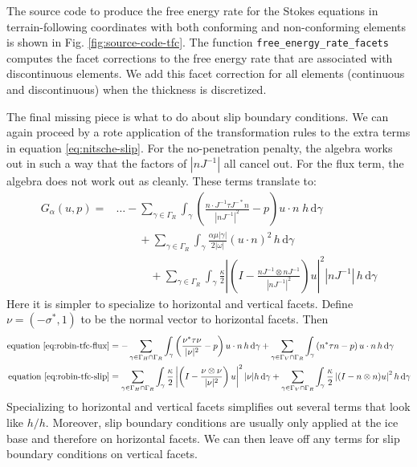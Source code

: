 \documentclass[gmd, manuscript]{copernicus}
\begin{document}
The source code to produce the free energy rate for the Stokes equations in terrain-following coordinates with both conforming and non-conforming elements is shown in Fig. \ref{fig:source-code-tfc}.
The function \texttt{free\_energy\_rate\_facets} computes the facet corrections to the free energy rate that are associated with discontinuous elements.
We add this facet correction for all elements (continuous and discontinuous) when the thickness is discretized.

The final missing piece is what to do about slip boundary conditions.
We can again proceed by a rote application of the transformation rules to the extra terms in equation \eqref{eq:nitsche-slip}.
For the no-penetration penalty, the algebra works out in such a way that the factors of $|nJ^{-1}|$ all cancel out.
For the flux term, the algebra does not work out as cleanly.
These terms translate to:
\begin{subequations}
    \begin{align}
        G_\alpha(u, p) = & \ldots - \sum_{\gamma\in\Gamma_R}\int_\gamma\left(\frac{n\cdot J^{-1}\tau J^{-*}n}{|nJ^{-1}|^2} - p\right)u\cdot n\; h\,\mathrm{d}\gamma \label{eq:robin-tfc-flux}\\
        & \qquad + \sum_{\gamma\in\Gamma_R}\int_\gamma\frac{\alpha\mu|\gamma|}{2|\omega|}(u\cdot n)^2\, h\,\mathrm{d}\gamma \\
        & \qquad\quad + \sum_{\gamma\in\Gamma_R}\int_\gamma\frac{\kappa}{2}\left|\left(I - \frac{nJ^{-1}\otimes nJ^{-1}}{|nJ^{-1}|^2}\right)u\right|^2|nJ^{-1}|\,h\,\mathrm{d}\gamma \label{eq:robin-tfc-slip}
    \end{align}
\end{subequations}
Here it is simpler to specialize to horizontal and vertical facets.
Define $\nu = (-\sigma^*, 1)$ to be the normal vector to horizontal facets.
Then
\begin{subequations}
    \begin{align}
        \text{equation \eqref{eq:robin-tfc-flux}} & = -\sum_{\gamma\in\Gamma_H\cap\Gamma_R}\int_\gamma\left(\frac{\nu^*\tau\nu}{|\nu|^2} - p\right)u\cdot n\,h\,\mathrm{d}\gamma + \sum_{\gamma\in\Gamma_V\cap\Gamma_R}\int_\gamma\left(n^*\tau n - p\right)u\cdot n\,h\,\mathrm{d}\gamma \\
        \text{equation \eqref{eq:robin-tfc-slip}} & = \sum_{\gamma\in\Gamma_H\cap\Gamma_R}\int_\gamma\frac{\kappa}{2}\left|\left(I - \frac{\nu\otimes\nu}{|\nu|^2}\right)u\right|^2|\nu|h\,\mathrm{d}\gamma + \sum_{\gamma\in\Gamma_V\cap\Gamma_R}\int_\gamma\frac{\kappa}{2}\left|(I - n\otimes n)u\right|^2h\,\mathrm{d}\gamma
    \end{align}
\end{subequations}
Specializing to horizontal and vertical facets simplifies out several terms that look like $h / h$.
Moreover, slip boundary conditions are usually only applied at the ice base and therefore on horizontal facets.
We can then leave off any terms for slip boundary conditions on vertical facets.
\end{document}
